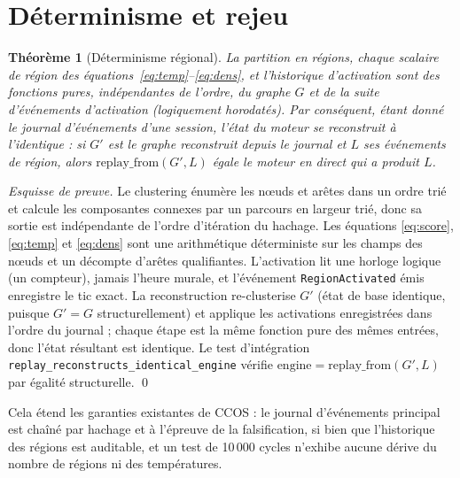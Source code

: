 \documentclass[11pt]{article}
\newtheorem{theorem}{Théorème}
\newcommand{\code}[1]{\texttt{#1}}
\begin{document}
\section{Déterminisme et rejeu}\label{sec:determinism}

\begin{theorem}[Déterminisme régional]
La partition en régions, chaque scalaire de région des
équations~\eqref{eq:temp}--\eqref{eq:dens}, et l'historique d'activation sont des
fonctions pures, indépendantes de l'ordre, du graphe $G$ et de la suite d'événements
d'activation (logiquement horodatés). Par conséquent, étant donné le journal
d'événements d'une session, l'état du moteur se reconstruit à l'identique : si $G'$
est le graphe reconstruit depuis le journal et $L$ ses événements de région, alors
$\mathrm{replay\_from}(G',L)$ égale le moteur en direct qui a produit $L$.
\end{theorem}
\begin{proof}[Esquisse de preuve]
Le clustering énumère les nœuds et arêtes dans un ordre trié et calcule les
composantes connexes par un parcours en largeur trié, donc sa sortie est indépendante
de l'ordre d'itération du hachage. Les équations \eqref{eq:score}, \eqref{eq:temp} et
\eqref{eq:dens} sont une arithmétique déterministe sur les champs des nœuds et un
décompte d'arêtes qualifiantes. L'activation lit une horloge logique (un compteur),
jamais l'heure murale, et l'événement \code{RegionActivated} émis enregistre le tic
exact. La reconstruction re-clusterise $G'$ (état de base identique, puisque
$G'\!=\!G$ structurellement) et applique les activations enregistrées dans l'ordre du
journal ; chaque étape est la même fonction pure des mêmes entrées, donc l'état
résultant est identique. Le test d'intégration
\code{replay\_reconstructs\_identical\_engine} vérifie
$\mathrm{engine}=\mathrm{replay\_from}(G',L)$ par égalité structurelle. \qed
\end{proof}

Cela étend les garanties existantes de CCOS : le journal d'événements principal est
chaîné par hachage et à l'épreuve de la falsification, si bien que l'historique des
régions est auditable, et un test de 10\,000 cycles n'exhibe aucune dérive du nombre
de régions ni des températures.
\end{document}
